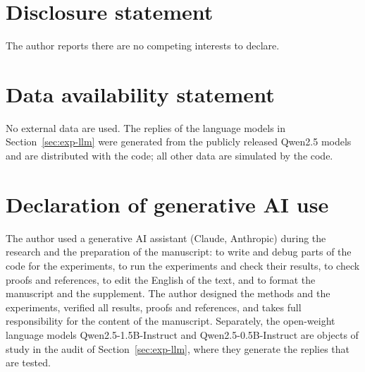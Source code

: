 \documentclass[12pt]{article}
\theoremstyle{remark}
\begin{document}
\section*{Disclosure statement}
The author reports there are no competing interests to declare.

\section*{Data availability statement}
No external data are used. The replies of the language models in
Section~\ref{sec:exp-llm} were generated from the publicly released Qwen2.5
models and are distributed with the code; all other data are simulated by the
code.

\section*{Declaration of generative AI use}
The author used a generative AI assistant (Claude, Anthropic) during the
research and the preparation of the manuscript: to write and debug parts of the
code for the experiments, to run the experiments and check their results, to
check proofs and references, to edit the English of the text, and to format the
manuscript and the supplement. The author designed the methods and the
experiments, verified all results, proofs and references, and takes full
responsibility for the content of the manuscript. Separately, the open-weight
language models Qwen2.5-1.5B-Instruct and Qwen2.5-0.5B-Instruct are objects of
study in the audit of Section~\ref{sec:exp-llm}, where they generate the
replies that are tested.



\end{document}
